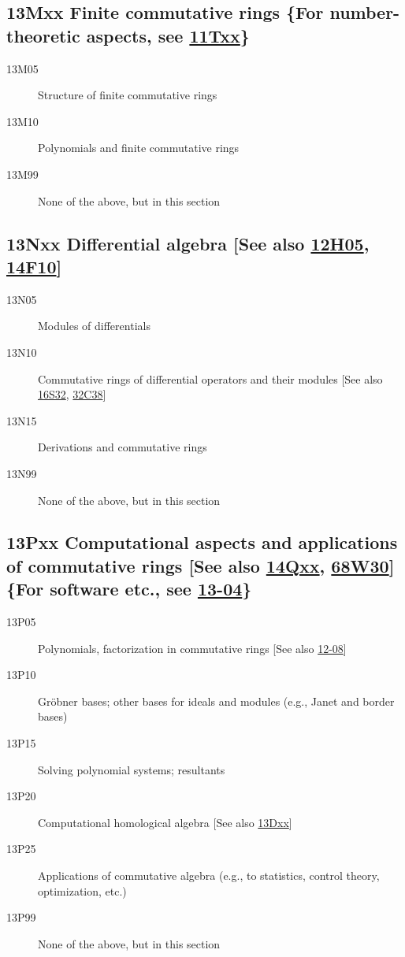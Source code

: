 \documentclass[letterpaper]{article}
\begin{document}
\subsection*{13Mxx Finite commutative rings \{For number-theoretic aspects, see \hyperref[11Txx]{11Txx}\} }\label{13Mxx}
\begin{description}               
\item [13M05]\label{13M05} Structure of finite commutative rings
\item [13M10]\label{13M10} Polynomials and finite commutative rings
\item [13M99]\label{13M99} None of the above, but in this section
\end{description}          
\subsection*{13Nxx Differential algebra [See also \hyperref[12H05]{12H05}, \hyperref[14F10]{14F10}] }\label{13Nxx}
\begin{description}               
\item [13N05]\label{13N05} Modules of differentials
\item [13N10]\label{13N10} Commutative rings of differential operators and their modules [See also \hyperref[16S32]{16S32}, \hyperref[32C38]{32C38}]
\item [13N15]\label{13N15} Derivations and commutative rings
\item [13N99]\label{13N99} None of the above, but in this section
\end{description}          
\subsection*{13Pxx Computational aspects and applications of commutative rings [See also \hyperref[14Qxx]{14Qxx}, \hyperref[68W30]{68W30}] \{For software etc., see \hyperref[13-04]{13-04}\}}\label{13Pxx}
\begin{description}               
\item [13P05]\label{13P05} Polynomials, factorization in commutative rings [See also \hyperref[12-08]{12-08}]
\item [13P10]\label{13P10} Gr\"{o}bner bases; other bases for ideals and modules (e.g., Janet and border bases)
\item [13P15]\label{13P15} Solving polynomial systems; resultants
\item [13P20]\label{13P20} Computational homological algebra [See also \hyperref[13Dxx]{13Dxx}]
\item [13P25]\label{13P25} Applications of commutative algebra (e.g., to statistics, control theory, optimization, etc.)
\item [13P99]\label{13P99} None of the above, but in this section
\end{description}               
\end{document}
